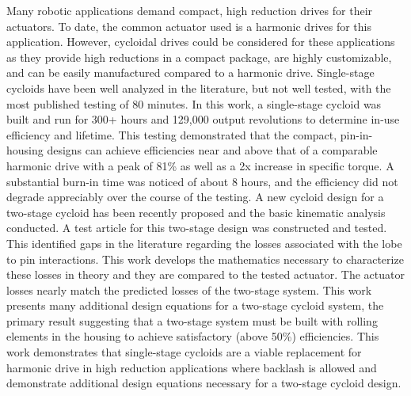 
Many robotic applications demand compact, high reduction drives for their actuators. To date, the common actuator used is a harmonic drives for this application. However, cycloidal drives could be considered for these applications as they provide high reductions in a compact package, are highly customizable, and can be easily manufactured compared to a harmonic drive. Single-stage cycloids have been well analyzed in the literature, but not well tested, with the most published testing of 80 minutes. In this work, a single-stage cycloid was built and run for 300+ hours and 129,000 output revolutions to determine in-use efficiency and lifetime. This testing demonstrated that the compact, pin-in-housing designs can achieve efficiencies near and above that of a comparable harmonic drive with a peak of 81\% as well as a 2x increase in specific torque. A substantial burn-in time was noticed of about 8 hours, and the efficiency did not degrade appreciably over the course of the testing. A new cycloid design for a two-stage cycloid has been recently proposed and the basic kinematic analysis conducted. A test article for this two-stage design was constructed and tested. This identified gaps in the literature regarding the losses associated with the lobe to pin interactions. This work develops the mathematics necessary to characterize these losses in theory and they are compared to the tested actuator. The actuator losses nearly match the predicted losses of the two-stage system. This work presents many additional design equations for a two-stage cycloid system, the primary result suggesting that a two-stage system must be built with rolling elements in the housing to achieve satisfactory (above 50\%) efficiencies. This work demonstrates that single-stage cycloids are a viable replacement for harmonic drive in high reduction applications where backlash is allowed and demonstrate additional design equations necessary for a two-stage cycloid design.


